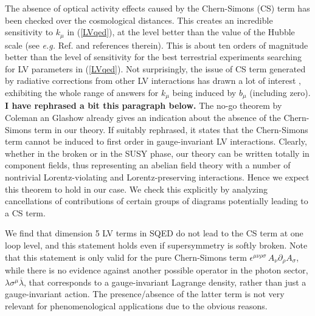 \documentclass[12pt]{revtex4}
\begin{document}
    The absence of optical activity effects caused by the Chern-Simons (CS) term 
    has been checked over the cosmological distances. This creates an 
    incredible sensitivity to $k_\mu$ in (\ref{LVqed}), at the level better 
    than the value of the Hubble scale (see {\em e.g.} Ref. \cite{CFJ} and references therein). 
   This is about ten orders of magnitude 
    better than the level of sensitivity for the best terrestrial experiments searching for 
    LV parameters in (\ref{LVqed}). Not surprisingly, the issue of 
CS term generated by radiative corrections from other LV interactions 
    has drawn a lot of interest \cite{CG,Jackiw:1999yp,Chung:1998jv,Andrianov:2001zj}, 
    exhibiting the whole range of answers for $k_\mu$ being induced by $b_\mu$ 
(including zero). 
    {\bf I have rephrased a bit this paragraph below.}
    The no-go theorem by Coleman an Glashow \cite{CG} already gives an indication
    about the absence of the Chern-Simons term in our theory. 
    If suitably rephrased, it states that
    the Chern-Simons term cannot be induced to first order in gauge-invariant
    LV interactions.
    Clearly, whether in the broken or in the SUSY phase, our theory can be written totally
    in component fields, thus representing an abelian field theory with a number of nontrivial
    Lorentz-violating and Lorentz-preserving interactions.
    Hence we expect this theorem 
    to hold in our case. 
    We check this explicitly by analyzing cancellations of contributions
    of certain groups of diagrams potentially leading to a CS term. 

	We find that dimension 5 LV terms in SQED do not lead to the CS term at one loop level,
	and this statement holds even if supersymmetry is softly broken.
 Note that this statement is only valid for the pure Chern-Simons term
$ \epsilon^{\mu\nu\rho\sigma}\, A_\nu \partial_\rho A_\sigma $, 
while there is no evidence against another possible operator in the 
    photon sector,  $ \lambda \sigma^\mu \overline{\lambda} $,
    that corresponds to a gauge-invariant Lagrange density, rather than just a 
    gauge-invariant action. The presence/absence of the latter term is not very relevant for
phenomenological applications due to the obvious reasons. 
\end{document}
